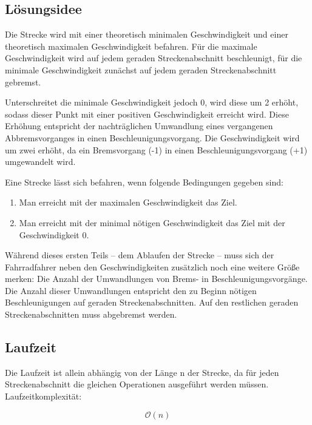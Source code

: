 \subsection {Lösungsidee}
	Die Strecke wird mit einer theoretisch minimalen Geschwindigkeit und einer theoretisch maximalen Geschwindigkeit befahren. 
	Für die maximale Geschwindigkeit wird auf jedem geraden Streckenabschnitt beschleunigt, für die minimale Geschwindigkeit zunächst auf jedem geraden Streckenabschnitt gebremst.

	Unterschreitet die minimale Geschwindigkeit jedoch 0, wird diese um 2 erhöht, sodass dieser Punkt mit einer positiven Geschwindigkeit erreicht wird.
	Diese Erhöhung entspricht der nachträglichen Umwandlung eines vergangenen Abbremsvorganges in einen Beschleunigungsvorgang. Die Geschwindigkeit wird um zwei erhöht, da ein Bremsvorgang (-1) in einen Beschleunigungsvorgang (+1) umgewandelt wird.
	
	Eine Strecke lässt sich befahren, wenn folgende Bedingungen gegeben sind:
	\begin{enumerate}
		\item Man erreicht mit der maximalen Geschwindigkeit das Ziel.
		\item Man erreicht mit der minimal nötigen Geschwindigkeit das Ziel mit der Geschwindigkeit 0.
	\end{enumerate}

	Während dieses ersten Teils – dem Ablaufen der Strecke – muss sich der Fahrradfahrer neben den Geschwindigkeiten zusätzlich noch
	eine weitere Größe merken: Die Anzahl der Umwandlungen von Brems- in Beschleunigungsvorgänge. Die Anzahl dieser Umwandlungen entspricht
	den zu Beginn nötigen Beschleunigungen auf geraden Streckenabschnitten. Auf den restlichen geraden Streckenabschnitten muss abgebremst werden.
\subsection{Laufzeit}
	Die Laufzeit ist allein abhängig von der Länge n der Strecke, da für jeden Streckenabschnitt die gleichen Operationen ausgeführt werden müssen. Laufzeitkomplexität: 

	\[
		\mathcal O(n)
	\]
